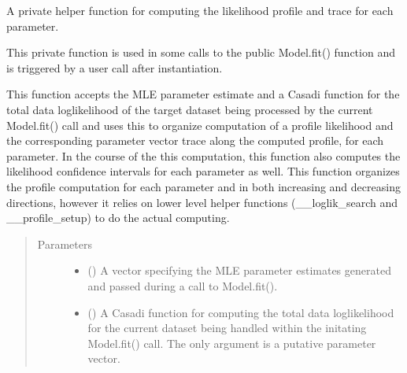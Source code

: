 \documentclass[letterpaper,10pt,english,openany,oneside]{sphinxmanual}
\begin{document}
\begin{fulllineitems}
\begin{fulllineitems}
\end{fulllineitems}


\begin{fulllineitems}
\label{\detokenize{nloed:nloed.model.Model.__profile_trace}}
A private helper function for computing the likelihood profile and trace for each
parameter.

This private function is used in some calls to the public Model.fit() function and is
triggered by a user call after instantiation.

This function accepts the MLE parameter estimate and a Casadi function for the total data
log\sphinxhyphen{}likelihood of the target dataset being processed by the current Model.fit() call
and uses this to organize computation of a profile likelihood and the corresponding
parameter vector trace along the computed profile, for each parameter. In the
course of the this computation, this function also computes the likelihood confidence
intervals for each parameter as well. This function organizes the profile computation for
each parameter and in both increasing and decreasing directions, however it relies on lower
level helper functions (\_\_loglik\_search and \_\_profile\_setup) to do the actual computing.
\begin{quote}\begin{description}
\item[{Parameters}] \leavevmode\begin{itemize}
\item {} 
 (\sphinxstyleliteralemphasis{\sphinxupquote{, }}) \textendash{} A vector specifying the MLE parameter estimates generated and
passed during a call to Model.fit().

\item {} 
 () \textendash{} A Casadi function for computing the total data log\sphinxhyphen{}likelihood
for the current dataset being handled within the initating Model.fit() call. The only
argument is a putative parameter vector.


\end{itemize}
\end{description}
\end{quote}
\end{fulllineitems}
\end{fulllineitems}
\end{document}
